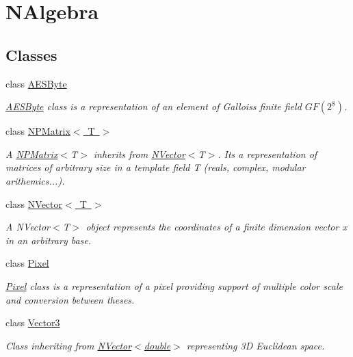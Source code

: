 \hypertarget{group___n_algebra}{}\section{N\+Algebra}
\label{group___n_algebra}
\subsection*{Classes}
\begin{DoxyCompactItemize}
\item 
class \mbox{\hyperlink{class_a_e_s_byte}{A\+E\+S\+Byte}}
\begin{DoxyCompactList}\small\item\em \mbox{\hyperlink{class_a_e_s_byte}{A\+E\+S\+Byte}} class is a representation of an element of Gallois\textquotesingle{}s finite field $ GF(2^8) $. \end{DoxyCompactList}\item 
class \mbox{\hyperlink{class_n_p_matrix}{N\+P\+Matrix$<$ T $>$}}
\begin{DoxyCompactList}\small\item\em A {\ttfamily \mbox{\hyperlink{class_n_p_matrix}{N\+P\+Matrix}}$<$T$>$} inherits from {\ttfamily \mbox{\hyperlink{class_n_vector}{N\+Vector}}$<$T$>$}. It\textquotesingle{}s a representation of matrices of arbitrary size in a template field {\ttfamily T} (reals, complex, modular arithemics...). \end{DoxyCompactList}\item 
class \mbox{\hyperlink{class_n_vector}{N\+Vector$<$ T $>$}}
\begin{DoxyCompactList}\small\item\em A N\+Vector$<$\+T$>$ object represents the coordinates of a finite dimension vector x in an arbitrary base. \end{DoxyCompactList}\item 
class \mbox{\hyperlink{class_pixel}{Pixel}}
\begin{DoxyCompactList}\small\item\em \mbox{\hyperlink{class_pixel}{Pixel}} class is a representation of a pixel providing support of multiple color scale and conversion between theses. \end{DoxyCompactList}\item 
class \mbox{\hyperlink{class_vector3}{Vector3}}
\begin{DoxyCompactList}\small\item\em Class inheriting from \mbox{\hyperlink{class_n_vector}{N\+Vector$<$double$>$}} representing 3D Euclidean space. \end{DoxyCompactList}\end{DoxyCompactItemize}
